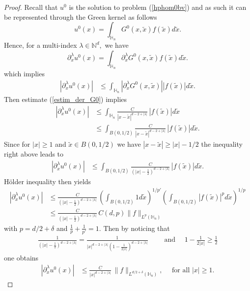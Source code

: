 \documentclass[11pt, reqno]{amsart}
\theoremstyle{definition}
\theoremstyle{remark}
\numberwithin{equation}{section}
\begin{document}
	\begin{proof}[Proof]
		Recall that $u^0$ is the solution to problem (\ref{hphom0bv}) and as such it can be represented through the Green kernel as follows$$u^0(x)= \int_{\mathbb{H}_n} G^{0} (x,\tilde{x}) f(\tilde{x})d\tilde{x}.$$
		Hence, for a multi-index $\lambda\in \mathbb{N}^d,$ we have 
		$$\partial^\lambda_x u^0(x)= \int_{\mathbb{H}_n} \partial^\lambda_x G^{0} (x,\tilde{x}) f(\tilde{x})d\tilde{x}.$$
		which implies 
		\begin{align*}
			|\partial^\lambda_x u^0(x)|&\leq \int_{\mathbb{H}_n}| \partial^\lambda_x G^{0} (x,\tilde{x})| |f(\tilde{x})|d\tilde{x}.
		\end{align*}	 
		Then estimate (\ref{estim_der_G0}) implies 
		\begin{align*}
			|	\partial^\lambda_x u^0(x)| &\leq  \int_{\mathbb{H}_n} \frac{C}{|x-\tilde{x}|^{d-2+|\lambda|}}\, | f(\tilde{x})|d\tilde{x}\\
			&\leq  \int_{B(0,1/2)} \frac{C}{|x-\tilde{x}|^{d-2+|\lambda|}}\, | f(\tilde{x})|d\tilde{x}.
		\end{align*}
		Since for $|x|\geq 1$ and  $\tilde{x}\in B(0,1/2)$ we have $|x-\tilde{x}|\geq |x| -1/2$ the inequality right above leads to 
		\begin{align*}
			|\partial^\lambda_x u^0(x)| &\leq  \int_{B(0,1/2)} \frac{C}{\left(|x|-\frac{1}{2}\right)^{d-2+|\lambda|}}\, | f(\tilde{x})|d\tilde{x}.
		\end{align*}
		H\"older inequality then yields 	
		\begin{align*}
			|\partial^\lambda_x u^0(x)| &\leq  \frac{C}{(|x|-\frac{1}{2})^{d-2+|\lambda|}}\, 
			\left(\int_{B(0,1/2)} 1 d\tilde{x}\right)^{1/p'} \left(
			\int_{B(0,1/2)} | f(\tilde{x})|^pd\tilde{x}\right)^{1/p}\\
			&\leq  \frac{C}{(|x|-\frac{1}{2})^{d-2+|\lambda|}}\, 
			C(d,p) \| f\|_{L^{p}(\mathbb{H}_n)}
		\end{align*} with $p=d/2+\delta$ and $\frac{1}{p}+\frac{1}{p'}=1  $.
		Then by noticing that
		\begin{align*}
			\frac{1}{(|x|-\frac{1}{2})^{d-2+|\lambda|}}= \frac{1}{|x|^{d-2+|\lambda|}\left(1-\frac{1}{2|x|}\right)^{d-2+|\lambda|}}
			\qquad \mbox{	and } \quad
			1-\frac{1}{2|x|}\geq \frac{1}{2}
		\end{align*} one obtains 
		\begin{align*}
			|	\partial^\lambda_x u^0(x)|
			&\leq  \frac{C}{|x|^{d-2+|\lambda|}}\, 
			\| f\|_{L^{d/2+\delta}(\mathbb{H}_n)}, \quad \mbox{ for all } |x|\geq 1.
		\end{align*}

\end{proof}
\end{document}
